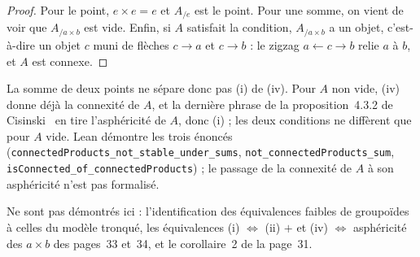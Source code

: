 \begin{proof}
Pour le point, $e \times e = e$ et $A_{/e}$ est le point. Pour une somme, on vient de voir que $A_{/a \times b}$ est vide. Enfin, si $A$ satisfait la condition, $A_{/a \times b}$ a un objet, c'est-à-dire un objet $c$ muni de flèches $c \to a$ et $c \to b$ : le zigzag $a \leftarrow c \to b$ relie $a$ à $b$, et $A$ est connexe.
\end{proof}

La somme de deux points ne sépare donc pas (i) de (iv). Pour $A$ non vide, (iv) donne déjà la connexité de $A$, et la dernière phrase de la proposition~4.3.2 de Cisinski~\cite{cisinski2006} en tire l'asphéricité de $A$, donc (i) ; les deux conditions ne diffèrent que pour $A$ vide. Lean démontre les trois énoncés (\texttt{connectedProducts\_not\_stable\_under\_sums}, \texttt{not\_connectedProducts\_sum}, \texttt{isConnected\_of\_connectedProducts}) ; le passage de la connexité de $A$ à son asphéricité n'est pas formalisé.

Ne sont pas démontrés ici : l'identification des équivalences faibles de groupoïdes à celles du modèle tronqué, les équivalences (i) $\Leftrightarrow$ (ii) $+$  et (iv) $\Leftrightarrow$ asphéricité des $a \times b$ des pages~33 et~34, et le corollaire~2 de la page~31.

